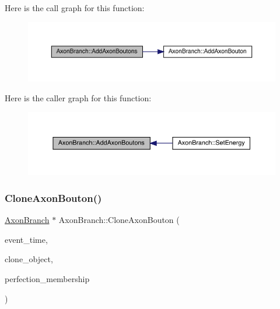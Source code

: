 Here is the call graph for this function\+:\nopagebreak
\begin{figure}[H]
\begin{center}
\leavevmode
\includegraphics[width=350pt]{class_axon_branch_a788ca8cc7e6f60f07b9e19a8e3022b64_cgraph}
\end{center}
\end{figure}
Here is the caller graph for this function\+:\nopagebreak
\begin{figure}[H]
\begin{center}
\leavevmode
\includegraphics[width=350pt]{class_axon_branch_a788ca8cc7e6f60f07b9e19a8e3022b64_icgraph}
\end{center}
\end{figure}
\mbox{\label{class_axon_branch_ae861207a8a0aeb2b60c305b25248e4b9}} 
\subsubsection{\texorpdfstring{Clone\+Axon\+Bouton()}{CloneAxonBouton()}}
{\footnotesize\ttfamily \hyperlink{class_axon_branch}{Axon\+Branch} $\ast$ Axon\+Branch\+::\+Clone\+Axon\+Bouton (\begin{DoxyParamCaption}\item[{std\+::chrono\+::time\+\_\+point$<$ \hyperlink{universe_8h_a0ef8d951d1ca5ab3cfaf7ab4c7a6fd80}{Clock} $>$}]{event\+\_\+time,  }\item[{\hyperlink{class_axon_branch}{Axon\+Branch} $\ast$}]{clone\+\_\+object,  }\item[{double}]{perfection\+\_\+membership }\end{DoxyParamCaption})}



